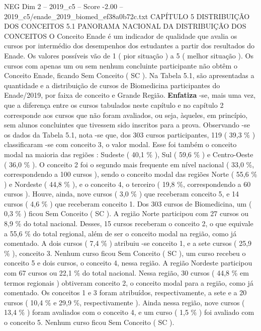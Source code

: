 \begin{textsample}{NEG Dim 2 – 2019\_c5 – Score -2.00 – 2019\_c5/enade\_2019\_biomed\_ef38a0b72c.txt}  \label{ex:f2_neg_096}
CAPÍTULO 5 DISTRIBUIÇÃO DOS CONCEITOS 5.1 PANORAMA NACIONAL DA DISTRIBUIÇÃO DOS CONCEITOS O Conceito Enade é um indicador de qualidade que avalia os cursos por intermédio dos desempenhos dos estudantes a partir dos resultados do Enade.
Os valores possíveis vão de 1 ( pior situação ) a 5 ( melhor situação ).
Os cursos com apenas um ou sem nenhum concluinte participante não obtêm o Conceito Enade, ficando Sem Conceito ( SC ).
Na Tabela 5.1, são apresentadas a quantidade e a distribuição de cursos de Biomedicina participantes do Enade/2019, por faixa de conceito e Grande Região. \textbf{Enfatiza} -se, mais uma vez, que a diferença entre os cursos tabulados neste capítulo e no capítulo 2 corresponde aos cursos que não foram avaliados, ou seja, àqueles, em princípio, sem alunos concluintes que tivessem sido inscritos para a prova.
Observando -se os dados da Tabela 5.1, nota -se que, dos 303 cursos participantes, 119 ( 39,3 \% ) classificaram -se com conceito 3, o valor modal.
Esse foi também o conceito modal na maioria das regiões : Sudeste ( 40,1 \% ), Sul ( 59,6 \% ) e Centro-Oeste ( 36,0 \% ).
O conceito 2 foi o segundo mais frequente em nível nacional ( 33,0 \%, correspondendo a 100 cursos ), sendo o conceito modal das regiões Norte ( 55,6 \% ) e Nordeste ( 44,8 \% ), e o conceito 4, o terceiro ( 19,8 \%, correspondendo a 60 cursos ).
Houve, ainda, nove cursos ( 3,0 \% ) que receberam conceito 5, e 14 cursos ( 4,6 \% ) que receberam conceito 1.
Dos 303 cursos de Biomedicina, um ( 0,3 \% ) ficou Sem Conceito ( SC ).
A região Norte participou com 27 cursos ou 8,9 \% do total nacional.
Desses, 15 cursos receberam o conceito 2, o que equivale a 55,6 \% do total regional, além de ser o conceito modal na região, como já comentado.
A dois cursos ( 7,4 \% ) atribuiu -se conceito 1, e a sete cursos ( 25,9 \% ), conceito 3.
Nenhum curso ficou Sem Conceito ( SC ), um curso recebeu o conceito 5 e dois cursos, o conceito 4, nessa região.
A região Nordeste participou com 67 cursos ou 22,1 \% do total nacional.
Nessa região, 30 cursos ( 44,8 \% em termos regionais ) obtiveram conceito 2, o conceito modal para a região, como já comentado.
Os conceitos 1 e 3 foram atribuídos, respectivamente, a sete e a 20 cursos ( 10,4 \% e 29,9 \%, respectivamente ).
Ainda nessa região, nove cursos ( 13,4 \% ) foram avaliados com o conceito 4, e um curso ( 1,5 \% ) foi avaliado com o conceito 5.
Nenhum curso ficou Sem Conceito ( SC ).

\end{textsample}
